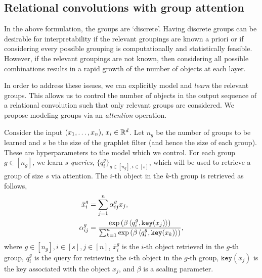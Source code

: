 \subsection{Relational convolutions with group attention}\label{ssec:relconv_groupattn}

In the above formulation, the groups are `discrete'. Having discrete groups can be desirable for interpretability if the relevant groupings are known a priori or if considering every possible grouping is computationally and statistically feasible. However, if the relevant groupings are not known, then considering all possible combinations results in a rapid growth of the number of objects at each layer.

In order to address these issues, we can explicitly model and \textit{learn} the relevant groups. This allows us to control the number of objects in the output sequence of a relational convolution such that only relevant groups are considered. We propose modeling groups via an \textit{attention} operation.

Consider the input $(x_1, \ldots, x_n),\, x_i \in \mathbb{R}^d$. Let $n_g$ be the number of groups to be learned and $s$ be the size of the graphlet filter (and hence the size of each group). These are hyperparameters to the model which we control. 
For each group $g \in [n_g]$, we learn $s$ \textit{queries}, $\{q_{i}^{g}\}_{g \in [n_g], i \in [s]}$, which will be used to retrieve a group of size $s$ via attention. The $i$-th object in the $k$-th group is retrieved as follows,
\begin{equation}\label{eq:group_attn}
    \begin{aligned}
        \bar{x}_{i}^{g} &= \sum_{j = 1}^{n} \alpha_{ij}^{g} x_j,\\
        \alpha_{ij}^{g} &= \frac{\exp\left(\beta \left \langle q_i^g, \mathtt{key}(x_j) \right\rangle\right)}{\sum_{k = 1}^{n}{\exp\left(\beta \left \langle q_i^g, \mathtt{key}(x_k) \right\rangle\right)}},
    \end{aligned}
\end{equation}
where $g \in [n_g], i \in [s], j \in [n]$, $\bar{x}_{i}^{g}$ is the $i$-th object retrieved in the $g$-th group, $q_{i}^{g}$ is the query for retrieving the $i$-th object in the $g$-th group, $\mathtt{key}(x_j)$ is the key associated with the object $x_j$, and $\beta$ is a scaling parameter. %

